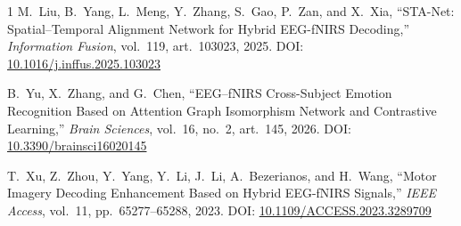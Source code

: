 \documentclass[journal]{IEEEtran}
\begin{document}
\begin{thebibliography}{1}
M.~Liu, B.~Yang, L.~Meng, Y.~Zhang, S.~Gao, P.~Zan, and X.~Xia, ``STA-Net: Spatial--Temporal Alignment Network for Hybrid EEG-fNIRS Decoding,'' \textit{Information Fusion}, vol.~119, art.~103023, 2025. DOI: \href{https://doi.org/10.1016/j.inffus.2025.103023}{10.1016/j.inffus.2025.103023}

B.~Yu, X.~Zhang, and G.~Chen, ``EEG--fNIRS Cross-Subject Emotion Recognition Based on Attention Graph Isomorphism Network and Contrastive Learning,'' \textit{Brain Sciences}, vol.~16, no.~2, art.~145, 2026. DOI: \href{https://doi.org/10.3390/brainsci16020145}{10.3390/brainsci16020145}

T.~Xu, Z.~Zhou, Y.~Yang, Y.~Li, J.~Li, A.~Bezerianos, and H.~Wang, ``Motor Imagery Decoding Enhancement Based on Hybrid EEG-fNIRS Signals,'' \textit{IEEE Access}, vol.~11, pp.~65277--65288, 2023. DOI: \href{https://doi.org/10.1109/ACCESS.2023.3289709}{10.1109/ACCESS.2023.3289709}

\end{thebibliography}
\end{document}
